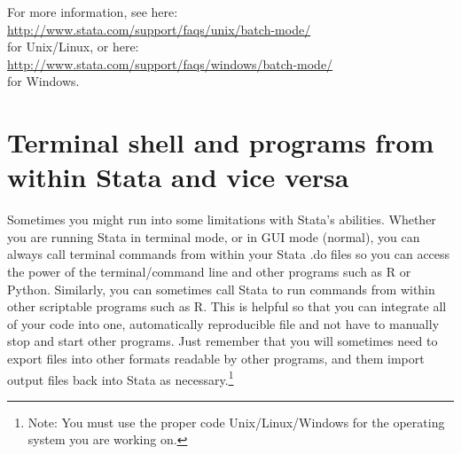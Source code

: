 \documentclass[11pt]{article}
\begin{document}
\noindent For more information, see here:\\
\url{http://www.stata.com/support/faqs/unix/batch-mode/} \\
for Unix/Linux, or here:\\
\url{http://www.stata.com/support/faqs/windows/batch-mode/}\\
for Windows.

\section{Terminal shell and programs from within Stata and vice versa}

\noindent Sometimes you might run into some limitations with Stata's abilities. Whether you are running Stata in terminal mode, or in GUI mode (normal), you can always call terminal commands from within your Stata .do files so you can access the power of the terminal/command line and other programs such as R or Python. Similarly, you can sometimes call Stata to run commands from within other scriptable programs such as R. This is helpful so that you can integrate all of your code into one, automatically reproducible file and not have to manually stop and start other programs. Just remember that you will sometimes need to export files into other formats readable by other programs, and them import output files back into Stata as necessary.\footnote{Note: You must use the proper code Unix/Linux/Windows for the operating system you are working on.} \\
\end{document}

